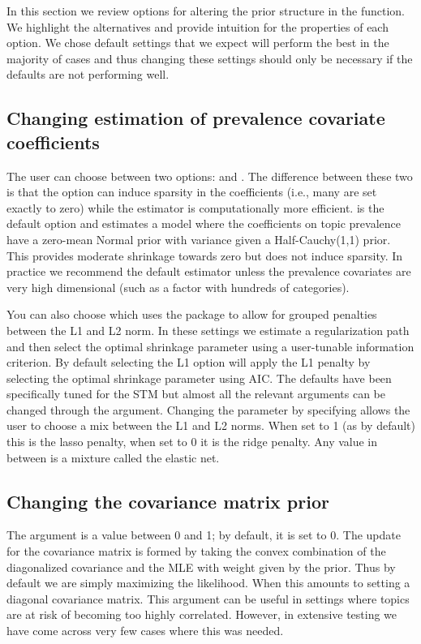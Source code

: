 \documentclass[article,shortnames]{jss}
\begin{document}
In this section we review options for altering the prior structure in the   function.  We highlight the alternatives and provide intuition for the properties of each option. We chose default settings that we expect will perform  the best in the majority of cases and thus changing these settings should only be necessary if the defaults are not performing well.

\subsection{Changing estimation of prevalence covariate coefficients}
The user can choose between two options:  and .   The difference between these two is that the  option can induce sparsity in the coefficients (i.e., many are set exactly to zero) while the  estimator is computationally more efficient.  is the default option and estimates a model where the coefficients on topic prevalence have a zero-mean Normal prior with variance given a Half-Cauchy(1,1) prior.  This provides moderate shrinkage towards zero but does not induce sparsity. In practice we recommend the default  estimator unless the prevalence covariates are very high dimensional (such as a factor with hundreds of categories).


You can also choose  which uses the  package \citep{friedman2010regularization} to allow for grouped penalties between the L1 and L2 norm. In these settings we estimate a regularization path and then select the optimal shrinkage parameter using a user-tunable information criterion. By default selecting the L1 option will apply the L1 penalty by selecting the optimal shrinkage parameter using AIC. The defaults have been specifically tuned for the STM but almost all the relevant arguments can be changed through the  argument. Changing the  parameter by specifying  allows the user to choose a mix between the L1 and L2 norms. When set to 1 (as by default) this is the lasso penalty, when set to 0 it is the ridge penalty. Any value in between is a mixture called the elastic net.

\subsection{Changing the covariance matrix prior}
The  argument is a value between 0 and 1; by default, it is set to 0.  The update for the covariance matrix is formed by taking the convex combination of the diagonalized covariance and the MLE with weight given by the prior.  Thus by default we are simply maximizing the likelihood.  When  this amounts to setting a diagonal covariance matrix.  This argument can be useful in settings where topics are at risk of becoming too highly correlated.  However, in extensive testing we have come across very few cases where this was needed.
\end{document}
